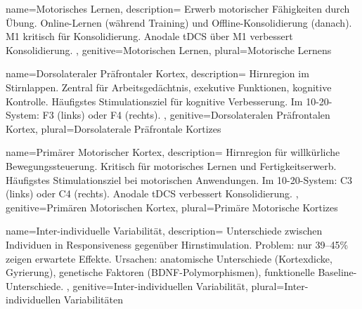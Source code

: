 {
	name=Motorisches Lernen,
	description={
			Erwerb motorischer Fähigkeiten durch Übung. Online-Lernen (während Training) und Offline-Konsolidierung (danach). \gls{M1} kritisch für Konsolidierung. Anodale \gls{tDCS} über M1 verbessert Konsolidierung. \cite{reis_noninvasive_2009}
		},
	genitive=Motorischen Lernen,
	plural=Motorische Lernens
}


{
	name=Dorsolateraler Präfrontaler Kortex,
	description={
			Hirnregion im Stirnlappen. Zentral für Arbeitsgedächtnis, exekutive Funktionen, kognitive Kontrolle. Häufigstes Stimulationsziel für kognitive Verbesserung. Im 10-20-System: F3 (links) oder F4 (rechts). \cite{hoy_enhancement_2016, woods_technical_2016}
		},
	genitive=Dorsolateralen Präfrontalen Kortex,
	plural=Dorsolaterale Präfrontale Kortizes
}


{
	name=Primärer Motorischer Kortex,
	description={
			Hirnregion für willkürliche Bewegungssteuerung. Kritisch für motorisches Lernen und Fertigkeitserwerb. Häufigstes Stimulationsziel bei motorischen Anwendungen. Im 10-20-System: C3 (links) oder C4 (rechts). Anodale \gls{tDCS} verbessert Konsolidierung. \cite{reis_noninvasive_2009}
		},
	genitive=Primären Motorischen Kortex,
	plural=Primäre Motorische Kortizes
}

\iffalse

	{
		name=Inter-individuelle Variabilität,
		description={
				Unterschiede zwischen Individuen in Responsiveness gegenüber Hirnstimulation. Problem: nur 39--45\% zeigen erwartete Effekte. Ursachen: anatomische Unterschiede (Kortexdicke, Gyrierung), genetische Faktoren (\gls{BDNF}-Polymorphismen), funktionelle Baseline-Unterschiede. \cite{vergallito_inter-individual_2022, chew_inter-_2015}
			},
		genitive=Inter-individuellen Variabilität,
		plural=Inter-individuellen Variabilitäten
	}

